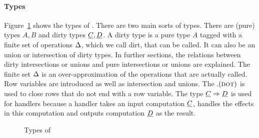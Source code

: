 \paragraph{Types}
Figure~\ref{fig:types:core} shows the types of \core. There are two main sorts of types. There are (pure) types $A, B$ and dirty types $\underline{C}, \underline{D}$. A dirty type is a pure type $A$ tagged with a finite set of operations $\Delta$, which we call dirt, that can be called. It can also be an union or intersection of dirty types. In further sections, the relations between dirty intersections or unions and pure intersections or unions are explained. The finite set $\Delta$ is an over-approximation of the operations that are actually called. Row variables are introduced as well as intersection and unions. The $. (\textsc{dot})$ is used to close rows that do not end with a row variable. The type $\underline{C} \Rightarrow \underline{D}$ is used for handlers because a handler takes an input computation $\underline{C}$, handles the effects in this computation and outputs computation $\underline{D}$ as the result.

\begin{figure}[!htb]
\begin{center}
\end{center}
\caption{Types of \core}\label{fig:types:core}
\end{figure}
